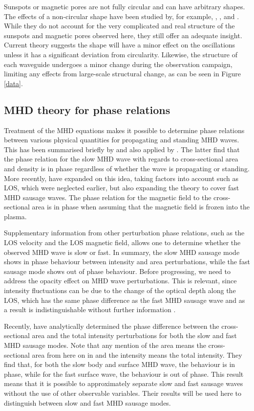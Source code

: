 	Sunspots or magnetic pores are not fully circular and can have arbitrary shapes.
	The effects of a non-circular shape have been studied by, for example, \citet{2003A&A...409..287R}, \citet{2009A&A...502..315M}, and \citet{2011A&A...527A..53M}.
	While they do not account for the very complicated and real structure of the sunspots and magnetic pores observed here, they still offer an adequate insight.
	Current theory suggests the shape will have a minor effect on the oscillations unless it has a significant deviation from circularity.
	Likewise, the structure of each waveguide undergoes a minor change during the observation campaign, limiting any effects from large-scale structural change, as can be seen in Figure \ref{data}.

\subsection{MHD theory for phase relations}
	
	Treatment of the MHD equations makes it possible to determine phase relations between various physical quantities for propagating and standing MHD waves.
	This has been summarised briefly by \citet{goedbloed} and also applied by \citet{PMHDW}.
	The latter find that the phase relation for the slow MHD wave with regards to cross-sectional area and density is in phase regardless of whether the wave is propagating or standing.
	More recently, \citet{Moreels2013} have expanded on this idea, taking factors into account such as LOS, which were neglected earlier, but also expanding the theory to cover fast MHD sausage waves.
	The phase relation for the magnetic field to the cross-sectional area is in phase when assuming that the magnetic field is frozen into the plasma.
	
	Supplementary information from other perturbation phase relations, such as the LOS velocity and the LOS magnetic field, allows one to determine whether the observed MHD wave is slow or fast.
	In summary, the slow MHD sausage mode shows in phase behaviour between intensity and area perturbations, while the fast sausage mode shows out of phase behaviour.
	Before progressing, we need to address the opacity effect on MHD wave perturbations.
	This is relevant, since intensity fluctuations can be due to the change of the optical depth along the LOS, which has the same phase difference as the fast MHD sausage wave and as a result is indistinguishable without further information \citep{PMHDW}.
	
	Recently, \citet{Moreels2013b} have analytically determined the phase difference between the cross-sectional area and the total intensity perturbations for both the slow and fast MHD sausage modes.
	Note that any mention of the area means the cross-sectional area from here on in and the intensity means the total intensity.
	They find that, for both the slow body and surface MHD wave, the behaviour is in phase, while for the fast surface wave, the behaviour is out of phase.
	This result means that it is possible to approximately separate slow and fast sausage waves without the use of other observable variables. Their results will be used here to distinguish between slow and fast MHD sausage modes.

